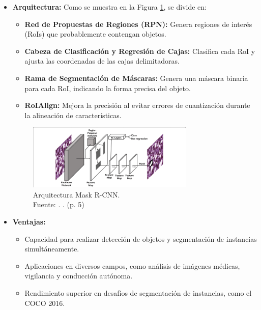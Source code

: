 \begin{itemize}
\begin{itemize} 
    \item \textbf{Arquitectura:} Como se muestra en la Figura \ref{2:maskrcnn}, se divide en:
    \begin{itemize} 
        \item \textbf{Red de Propuestas de Regiones (RPN):} Genera regiones de interés (RoIs) que probablemente contengan objetos. \parencite{Jung2019AutomaticNucleiSegmentation}
        \item \textbf{Cabeza de Clasificación y Regresión de Cajas:} Clasifica cada RoI y ajusta las coordenadas de las cajas delimitadoras. \parencite{Jung2019AutomaticNucleiSegmentation}
        \item \textbf{Rama de Segmentación de Máscaras:} Genera una máscara binaria para cada RoI, indicando la forma precisa del objeto. \parencite{Jung2019AutomaticNucleiSegmentation}
        \item \textbf{RoIAlign:} Mejora la precisión al evitar errores de cuantización durante la alineación de características. \parencite{Jung2019AutomaticNucleiSegmentation}
    \end{itemize}

    \begin{figure}[H]
        \begin{center}
            \includegraphics[width=0.75\textwidth]{2/figures/Mask-R-CNN.png}
            \caption[Arquitectura Mask R-CNN]{Arquitectura Mask R-CNN.\\
            Fuente: \cite{Jung2019AutomaticNucleiSegmentation}. . (p. 5)}
            \label{2:maskrcnn}
        \end{center}
    \end{figure}

    \item \textbf{Ventajas:}
    \begin{itemize} 
        \item Capacidad para realizar detección de objetos y segmentación de instancias simultáneamente. \parencite{Jung2019AutomaticNucleiSegmentation}
        \item Aplicaciones en diversos campos, como análisis de imágenes médicas, vigilancia y conducción autónoma. \parencite{Jung2019AutomaticNucleiSegmentation}
        \item Rendimiento superior en desafíos de segmentación de instancias, como el COCO 2016. \parencite{Jung2019AutomaticNucleiSegmentation}
    \end{itemize}
\end{itemize}


\end{itemize}


